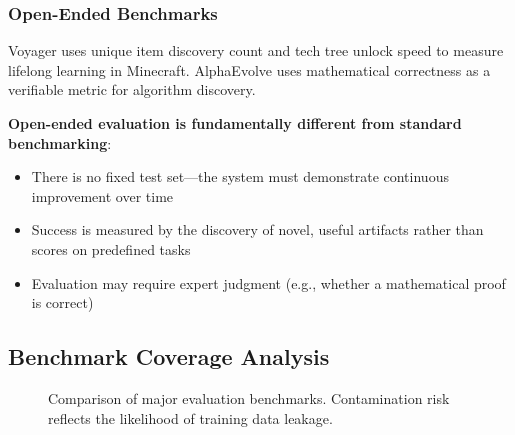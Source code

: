 \subsubsection{Open-Ended Benchmarks}

Voyager uses unique item discovery count and tech tree unlock speed to measure lifelong learning in Minecraft. AlphaEvolve uses mathematical correctness as a verifiable metric for algorithm discovery.

\textbf{Open-ended evaluation is fundamentally different from standard benchmarking}:
\begin{itemize}
\item There is no fixed test set---the system must demonstrate continuous improvement over time
\item Success is measured by the discovery of novel, useful artifacts rather than scores on predefined tasks
\item Evaluation may require expert judgment (e.g., whether a mathematical proof is correct)
\end{itemize}

\subsection{Benchmark Coverage Analysis}\label{sec:ch5-coverage}

\begin{figure}[htbp]
\centering
{}
\caption{Comparison of major evaluation benchmarks. Contamination risk reflects the likelihood of training data leakage.}
\label{fig:bench-compare}
\end{figure}

